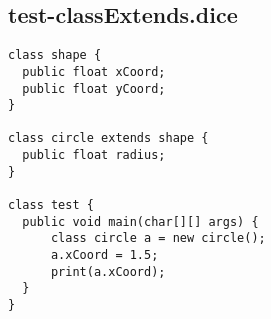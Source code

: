 \subsection{test-classExtends.dice}
\begin{verbatim}
class shape {
  public float xCoord;
  public float yCoord;
}

class circle extends shape {
  public float radius;
}

class test {
  public void main(char[][] args) {
      class circle a = new circle(); 
      a.xCoord = 1.5;
      print(a.xCoord);
  }
}
\end{verbatim}